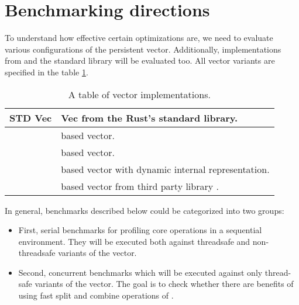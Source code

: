 \section{Benchmarking directions}
To understand how effective certain optimizations are, we need to evaluate various configurations of the persistent vector. Additionally, implementations from \imrsvec{} and the standard library will be evaluated too. All vector variants are specified in the table \ref{tab:vec-implementations}. 

\begin{table}
    \centering

    \begin{tabular} { |l| p{10cm} | }
        \hline
        STD Vec & Vec from the Rust's standard library. \\ \hline
        \rbvec{} & \rbtree{} based vector. \\ \hline
        \rrbvec{} & \rrbtree{} based vector. \\ \hline
        \pvec{} & \rrbtree{} based vector with dynamic internal representation. \\ \hline
        \imrsvec{} & \rrbtree{} based vector from third party library \imrsvec{}. \\ \hline        
    \end{tabular}
    
    \label{tab:vec-implementations}
    \caption{A table of vector implementations.}
\end{table}


In general, benchmarks described below could be categorized into two groups:

\begin{itemize}
    \item First, serial benchmarks for profiling core operations in a sequential environment. They will be executed both against threadsafe and non-threadsafe variants of the vector. 
    \item Second, concurrent benchmarks which will be executed against only thread-safe variants of the vector. The goal is to check whether there are benefits of using fast split and combine operations of \rrbvec{}.
\end{itemize}


